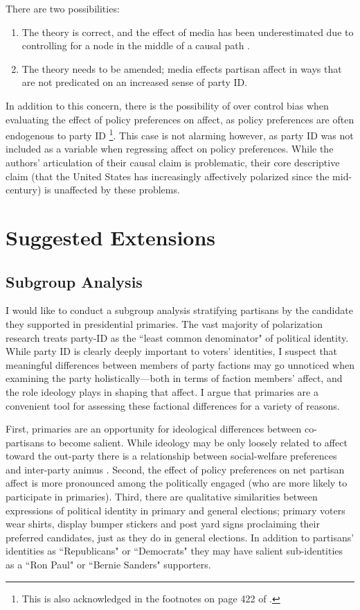\documentclass[12pt]{article}
\begin{document}
There are two possibilities:
\begin{enumerate}
\item The theory is correct, and the effect of media has been underestimated due to controlling for a node  in the middle of a causal path \citep{elwert2014endogenous}.
\item The theory needs to be amended; media effects partisan affect in ways that are not predicated on an increased sense of party ID.
\end{enumerate}
In addition to this concern, there is the possibility of over control bias when evaluating the effect of policy preferences on affect, as policy preferences are often endogenous to party ID \citep{druckman2013elite}\footnote{This is also acknowledged in the footnotes on page 422 of \citeauthor{iyengar2012affect}.}. This case is not alarming however, as party ID was not included as a variable when regressing affect on policy preferences. While the authors' articulation of their causal claim is problematic, their core descriptive claim (that the United States has increasingly affectively polarized since the mid- century) is unaffected by these problems.

\section{Suggested Extensions}
\subsection{Subgroup Analysis}
I would like to conduct a subgroup analysis stratifying partisans by the candidate they supported in presidential primaries. The vast majority of polarization research treats party-ID as the ``least common denominator" of political identity. While party ID is clearly deeply important to voters' identities, I suspect that meaningful differences between members of party factions may go unnoticed when examining the party holistically---both in terms of faction members' affect, and the role ideology plays in shaping that affect. I argue that primaries are a convenient tool for assessing these factional differences for a variety of reasons.

 First, primaries are an opportunity for ideological differences between co-partisans to become salient. While ideology may be only loosely related to affect toward the out-party there is a relationship between social-welfare preferences and inter-party animus \citep[p. 423]{iyengar2012affect}. Second, the effect of policy preferences on net partisan affect is more pronounced among the politically engaged (who are more likely to participate in primaries). Third, there are qualitative similarities between expressions of political identity in primary and general elections; primary voters wear shirts, display bumper stickers and post yard signs proclaiming their preferred candidates, just as they do in general elections. In addition to partisans' identities as  ``Republicans" or ``Democrats" they may have salient sub-identities as a ``Ron Paul" or ``Bernie Sanders" supporters.
 
\end{document}
